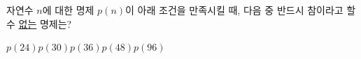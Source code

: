 자연수 $n$에 대한 명제 $p(n)$이 아래 조건을 만족시킬 때, 다음 중 반드시 참이라고 할 수 \underline{없는} 명제는? 
\begin{choices32}{$p(24)$}{$p(30)$}{$p(36)$}{$p(48)$}{$p(96)$}\end{choices32}
